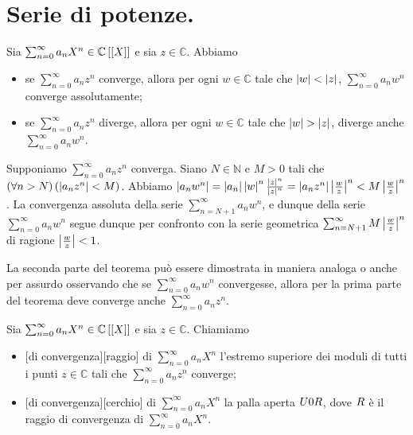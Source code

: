 \section{Serie di potenze.}\label{SerieDiPotenze}
\begin{Theorem}
	Sia $\sum_{n = 0}^\infty a_n X^n \in \mathbb{C} \left [ \left [ X \right ] \right ]$ e sia $z \in \mathbb{C}$. Abbiamo
	\begin{itemize}
		\item se $\sum_{n = 0}^\infty a_n z^n$ converge, allora per ogni $w \in \mathbb{C}$ tale che $\left \lvert w \right \rvert < \left \lvert z \right \rvert$, $\sum_{n = 0}^\infty a_n w^n$ converge assolutamente;
		\item se $\sum_{n = 0}^\infty a_n z^n$ diverge, allora per ogni $w \in \mathbb{C}$ tale che $\left \lvert w \right \rvert > \left \lvert z \right \rvert$, diverge anche $\sum_{n = 0}^\infty a_n w^n$.
	\end{itemize}
\end{Theorem}
\Proof Supponiamo $\sum_{n = 0}^\infty a_n z^n$ converga. Siano $N \in \mathbb{N}$ e $M > 0$ tali che $\left ( \forall n > N \right ) \left ( \left \lvert a_n z^n \right \rvert < M \right )$. Abbiamo $\left \lvert a_n w^n \right \rvert = \left \lvert a_n \right \rvert \left \lvert w \right \rvert^n \frac{\left \lvert z \right \rvert^n}{\left \lvert z \right \rvert^n} = \left \lvert a_n z^n \right \rvert \left \lvert \frac{w}{z} \right \rvert^n < M \left \lvert \frac{w}{z} \right \rvert^n$. La convergenza assoluta della serie $\sum_{n = N + 1}^\infty a_n w^n$, e dunque della serie $\sum_{n = 0}^\infty a_n w^n$ segue dunque per confronto con la serie geometrica $\sum_{n = N + 1}^\infty M \left \lvert \frac{w}{z} \right \rvert^n$ di ragione $\left \lvert \frac{w}{z} \right \rvert < 1$.
\par La seconda parte del teorema pu\`o essere dimostrata in maniera analoga o anche per assurdo osservando che se $\sum_{n = 0}^\infty a_n w^n$ convergesse, allora per la prima parte del teorema deve converge anche $\sum_{n = 0}^\infty a_n z^n$. \EndProof
\begin{Definition}
	Sia $\sum_{n = 0}^\infty a_n X^n \in \mathbb{C} \left [ \left [ X \right ] \right ]$ e sia $z \in \mathbb{C}$. Chiamiamo
	\begin{itemize}
		\item {}[di convergenza][raggio] di $\sum_{n = 0}^\infty a_n X^n$ l'estremo superiore dei moduli di tutti i punti $z \in \mathbb{C}$ tali che $\sum_{n = 0}^\infty a_n z^n$ converge;
		\item {}[di convergenza][cerchio] di $\sum_{n = 0}^\infty a_n X^n$ la palla aperta $U{0}{R}$, dove $R$ \`e il raggio di convergenza di $\sum_{n = 0}^\infty a_n X^n$.
	\end{itemize}
\end{Definition}
